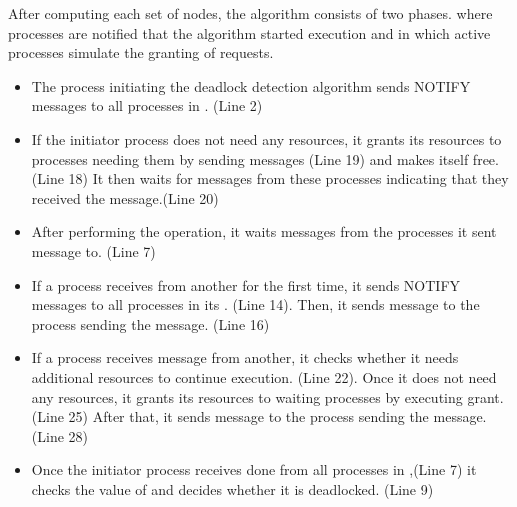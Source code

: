 \documentclass[letterpaper,10pt,english]{sphinxmanual}
\begin{document}
\sphinxAtStartPar
After computing each set of nodes, the algorithm consists of two phases.  \sphinxhyphen{} where processes are notified that the algorithm started execution \sphinxhyphen{} and  in which active processes simulate the granting of requests.
\begin{itemize}
\item {} 
\sphinxAtStartPar
The process initiating the deadlock detection algorithm sends NOTIFY messages to all processes in . (Line 2)

\item {} 
\sphinxAtStartPar
If the initiator process does not need any resources, it grants its resources to processes needing them by sending  messages (Line 19) and makes itself free. (Line 18) It then waits for  messages from these processes indicating that they received the  message.(Line 20)

\item {} 
\sphinxAtStartPar
After performing the  operation, it waits  messages from the processes it sent  message to. (Line 7)

\item {} 
\sphinxAtStartPar
If a process receives  from another for the first time, it sends NOTIFY messages to all processes in its . (Line 14). Then, it sends  message to the process sending the  message. (Line 16)

\item {} 
\sphinxAtStartPar
If a process receives  message from another, it checks whether it needs additional resources to continue execution. (Line 22). Once it does not need any resources, it grants its resources to waiting processes by executing grant. (Line 25) After that, it sends  message to the process sending the  message. (Line 28)

\item {} 
\sphinxAtStartPar
Once the initiator process receives done from all processes in ,(Line 7) it checks the value of  and decides whether it is deadlocked. (Line 9)

\end{itemize}
\end{document}
